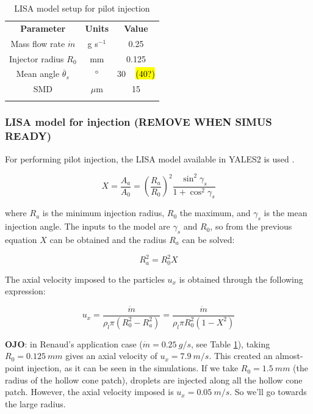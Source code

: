 

\begin{table}[!h]
\centering
\caption{LISA model setup for pilot injection}
\begin{tabular}{ccc}
\thickhline
\textbf{Parameter} & \textbf{Units} &  \textbf{Value} \\
\thickhline
Mass flow rate $\dot{m}$ & g s$^{-1}$ & 0.25 \\
Injector radius $R_0$ & mm & 0.125 \\
Mean angle $\overline{\theta}_s$ & $\degree$ & 30 ~ \hl{(40?)} \\
SMD & $\mu$m & 15 \\
\thickhline
\end{tabular}
\label{tab:LISA_model_parameters}
\end{table}

\subsubsection*{LISA model for injection (REMOVE WHEN SIMUS READY)}

For performing pilot injection, the LISA model available in YALES2 is used . 

\begin{equation}
X = \frac{A_a}{A_0} = \left( \frac{R_a}{R_0} \right)^2 \frac{\sin^2 \gamma_s}{1 + \cos^2 \gamma_s}
\end{equation}

where $R_a$ is the minimum injection radius, $R_0$ the maximum, and $\gamma_s$ is the mean injection angle. The inputs to the model are $\gamma_s$ and $R_0$, so from the previous equation $X$ can be obtained and the radius $R_a$ can be solved:

\begin{equation}
R_a^2 = R_0^2 X
\end{equation}

The axial velocity imposed to the particles $u_x$ is obtained through the following expression:

\begin{equation}
u_x = \frac{\dot{m}}{\rho_l \pi \left( R_0^2 - R_a^2 \right)} = \frac{\dot{m}}{\rho_l \pi R_0^2 \left( 1 - X^2 \right)} 
\end{equation}

\textbf{OJO}: in Renaud's application case ($\dot{m} = 0.25 ~ g/s$, see Table \ref{tab:LISA_model_parameters}), taking $R_0 = 0.125 ~mm$ gives an axial velocity of $u_x = 7.9 ~ m/s$. This created an almost-point injection, as it can be seen in the simulations. If we take $R_0 = 1.5 ~mm$ (the radius of the hollow cone patch), droplets are injected along all the hollow cone patch. However, the axial velocity imposed is $u_x = 0.05 ~m/s$. So we'll go towards the large radius.

